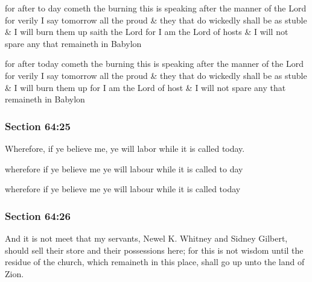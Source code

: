		\begin{framed}
		\scriptsize
			\begin{compactdesc}
				\item[JSP] for after to day cometh the burning this is speaking after the manner of the Lord for verily I say tomorrow all the proud \& they that do wickedly shall be as stuble \& I will burn them up saith the Lord for I am the Lord of hosts \& I will not spare any that remaineth in Babylon
				\item[Gilbert] for after today cometh the burning this is speaking after the manner of the Lord for verily I say tomorrow all the proud \& they that do wickedly shall be as stuble \& I will burn them up for I am the Lord of host \& I will not spare any that remaineth in Babylon
			\end{compactdesc}
		\end{framed}

	\subsubsection{Section 64:25} %
		\label{DC64-25}

		Wherefore, if ye believe me, ye will labor while it is called today.

		\begin{framed}
		\scriptsize
			\begin{compactdesc}
				\item[JSP] wherefore if ye believe me ye will labour while it is called to day
				\item[Gilbert] wherefore if ye believe me ye will labour while it is called today
			\end{compactdesc}
		\end{framed}

	\subsubsection{Section 64:26} %
		\label{DC64-26}

		And it is not meet that my servants, Newel K. Whitney and Sidney Gilbert, should sell their store and their possessions here; for this is not wisdom until the residue of the church, which remaineth in this place, shall go up unto the land of Zion.

